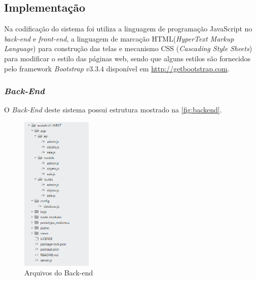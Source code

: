 

\subsection{Implementação}

Na codificação do sistema foi utiliza a linguagem de programação JavaScript no \textit{back-end} e \textit{front-end}, a linguagem de marcação HTML(\textit{HyperText Markup Language}) para construção das telas e mecanismo CSS (\textit{Cascading Style Sheets}) para modificar o estilo das páginas web, sendo que alguns estilos são fornecidos pelo framework \textit{Bootstrap} $v3.3.4$ disponível em \url{http://getbootstrap.com}.

\subsubsection{\textit{Back-End}}

O \textit{Back-End} deste sistema possui estrutura mostrado na \autoref{fig:backend}.
\begin{figure}[H]
	  \caption{\label{fig:backend}Arquivos do Back-end}
	  \centering
	  \includegraphics[width=0.3\textwidth]{Figuras/back_end.PNG}
\end{figure}
    
